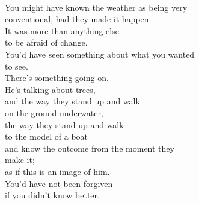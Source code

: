 \documentclass[smalldemyvopaper,11pt,twoside,onecolumn,openright,extrafontsizes]{memoir}
\begin{document}
\\You might have known the weather as being very
\\conventional, had they made it happen.
\\It was more than anything else
\\to be afraid of change.
\\You'd have seen something about what you wanted
\\to see.
\\There's something going on.
\\He's talking about trees,
\\and the way they stand up and walk
\\on the ground underwater,
\\the way they stand up and walk
\\to the model of a boat
\\and know the outcome from the moment they
\\make it;
\\as if this is an image of him.
\\You'd have not been forgiven
\\if you didn't know better.
\end{document}
